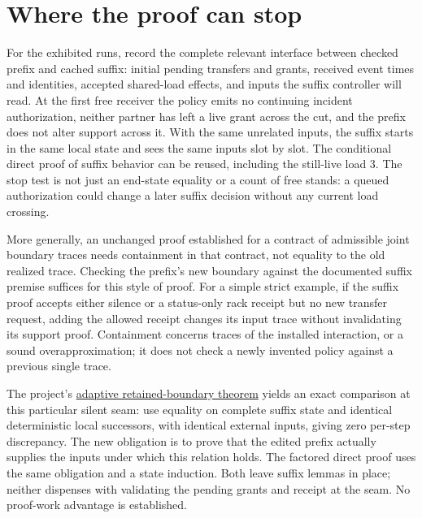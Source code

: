 \documentclass[11pt]{article}
\begin{document}
\section{Where the proof can stop}
For the exhibited runs, record the complete relevant interface between checked prefix and cached suffix: initial pending transfers and grants, received event times and identities, accepted shared-load effects, and inputs the suffix controller will read. At the first free receiver the policy emits no continuing incident authorization, neither partner has left a live grant across the cut, and the prefix does not alter support across it. With the same unrelated inputs, the suffix starts in the same local state and sees the same inputs slot by slot. The conditional direct proof of suffix behavior can be reused, including the still-live load 3. The stop test is not just an end-state equality or a count of free stands: a queued authorization could change a later suffix decision without any current load crossing.

More generally, an unchanged proof established for a contract of admissible joint boundary traces needs containment in that contract, not equality to the old realized trace. Checking the prefix's new boundary against the documented suffix premise suffices for this style of proof. For a simple strict example, if the suffix proof accepts either silence or a status-only rack receipt but no new transfer request, adding the allowed receipt changes its input trace without invalidating its support proof. Containment concerns traces of the installed interaction, or a sound overapproximation; it does not check a newly invented policy against a previous single trace.

The project’s \href{https://github.com/eternal-november/eos-research-programmes/blob/e1348964f73704212d2d8b48d5982a5ed600a2ff/projects/contextual-composition/feedback-and-concurrency/retained-boundary-refinement/Retained_Boundary_Refinement_and_Correlation.tex\#L299-L325}{adaptive retained-boundary theorem} yields an exact comparison at this particular silent seam: use equality on complete suffix state and identical deterministic local successors, with identical external inputs, giving zero per-step discrepancy. The new obligation is to prove that the edited prefix actually supplies the inputs under which this relation holds. The factored direct proof uses the same obligation and a state induction. Both leave suffix lemmas in place; neither dispenses with validating the pending grants and receipt at the seam. No proof-work advantage is established.
\end{document}
